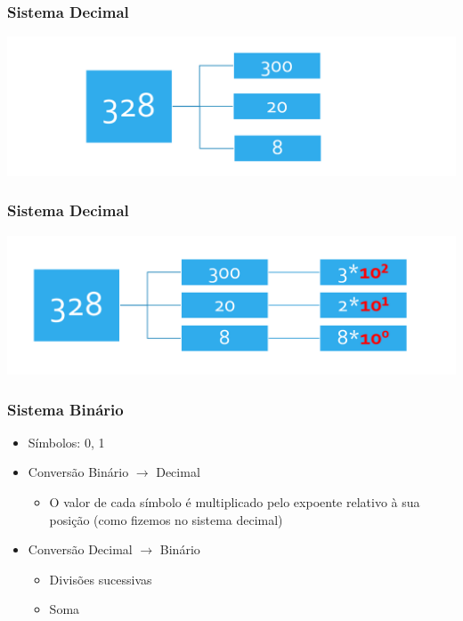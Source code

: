 \documentclass[aspectratio=169,
				xcolor=table]{beamer}
\begin{document}
		\begin{frame}
			\frametitle{Sistema Decimal}
			\includegraphics[width=\textwidth, keepaspectratio]{../figs/cap02/decimal02.png}  		
		\end{frame}
	
		\begin{frame}
			\frametitle{Sistema Decimal}
			\includegraphics[width=\textwidth]{../figs/cap02/decimal03.png} 		
		\end{frame}
		
		\begin{frame}
			\frametitle{Sistema Binário}
			\begin{itemize}
				\item Símbolos: 0, 1			
				\vspace{0.5cm}
				\item Conversão Binário $\to$ Decimal
				\begin{itemize}
					\item O valor de cada símbolo é multiplicado pelo expoente relativo à sua posição (como fizemos no sistema decimal)
				\end{itemize}			
				\vspace{0.5cm}
				\item Conversão Decimal $\to$ Binário
				\begin{itemize}
					\item Divisões sucessivas
					\item Soma
				\end{itemize}
			\end{itemize}
		\end{frame}
	
\end{document}

